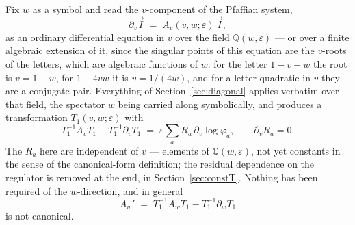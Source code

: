 \documentclass[11pt]{article}
\newcommand{\eps}{\varepsilon}
\newcommand{\Q}{\mathbb{Q}}
\begin{document}
Fix $w$ as a symbol and read the $v$-component of the Pfaffian
system,
\begin{equation}
  \partial_v \vec I \;=\; A_v(v,w;\eps)\, \vec I ,
\end{equation}
as an ordinary differential equation in $v$ over the field
$\Q(w,\eps)$ --- or over a finite algebraic extension of it, since
the singular points of this equation are the $v$-roots of the
letters, which are algebraic functions of $w$: for the letter
$1-v-w$ the root is $v = 1-w$, for $1-4vw$ it is $v = 1/(4w)$, and
for a letter quadratic in $v$ they are a conjugate pair.  Everything
of Section~\ref{sec:diagonal} applies verbatim over that field, the
spectator $w$ being carried along symbolically, and produces a
transformation $T_1(v,w;\eps)$ with
\begin{equation}
  T_1^{-1}A_v T_1 - T_1^{-1}\partial_v T_1
  \;=\; \eps \sum_a R_a\,\partial_v \log\varphi_a ,
  \qquad \partial_v R_a = 0 .
\end{equation}
The $R_a$ here are independent of $v$ --- elements of $\Q(w,\eps)$,
not yet constants in the sense of the canonical-form definition; the
residual dependence on the regulator is removed at the end, in
Section~\ref{sec:constT}.  Nothing has been required of the
$w$-direction, and in general
\begin{equation}
  A_w' \;=\; T_1^{-1}A_w T_1 - T_1^{-1}\partial_w T_1
\end{equation}
is not canonical.
\end{document}
